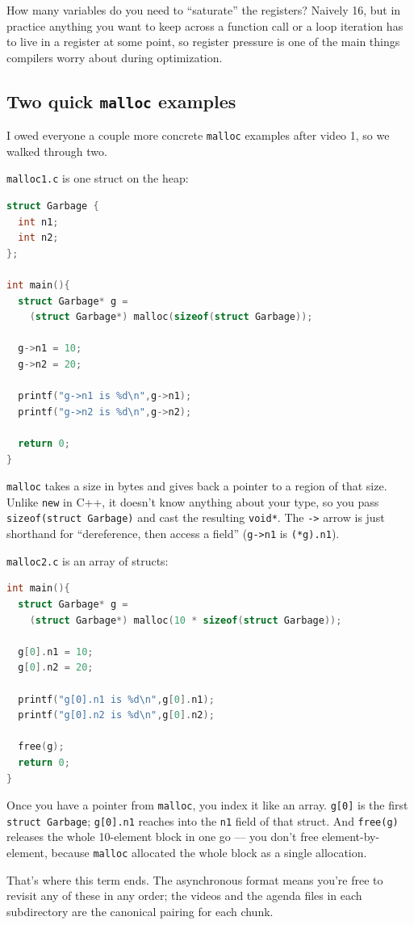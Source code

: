 \documentclass[11pt]{article}
\begin{document}
How many variables do you need to ``saturate'' the registers? Naively
16, but in practice anything you want to keep across a function call
or a loop iteration has to live in a register at some point, so
register pressure is one of the main things compilers worry about
during optimization.

\subsection*{Two quick \texttt{malloc} examples}

I owed everyone a couple more concrete \texttt{malloc} examples after
video 1, so we walked through two.

\texttt{malloc1.c} is one struct on the heap:

\begin{lstlisting}[language=C]
struct Garbage {
  int n1;
  int n2;
};

int main(){
  struct Garbage* g =
    (struct Garbage*) malloc(sizeof(struct Garbage));

  g->n1 = 10;
  g->n2 = 20;

  printf("g->n1 is %d\n",g->n1);
  printf("g->n2 is %d\n",g->n2);

  return 0;
}
\end{lstlisting}

\texttt{malloc} takes a size in bytes and gives back a pointer to a
region of that size. Unlike \texttt{new} in C++, it doesn't know
anything about your type, so you pass \texttt{sizeof(struct
  Garbage)} and cast the resulting \texttt{void*}. The \texttt{->}
arrow is just shorthand for ``dereference, then access a field''
(\texttt{g->n1} is \texttt{(*g).n1}).

\texttt{malloc2.c} is an array of structs:

\begin{lstlisting}[language=C]
int main(){
  struct Garbage* g =
    (struct Garbage*) malloc(10 * sizeof(struct Garbage));

  g[0].n1 = 10;
  g[0].n2 = 20;

  printf("g[0].n1 is %d\n",g[0].n1);
  printf("g[0].n2 is %d\n",g[0].n2);

  free(g);
  return 0;
}
\end{lstlisting}

Once you have a pointer from \texttt{malloc}, you index it like an
array. \texttt{g[0]} is the first \texttt{struct Garbage};
\texttt{g[0].n1} reaches into the \texttt{n1} field of that struct.
And \texttt{free(g)} releases the whole 10-element block in one go
--- you don't free element-by-element, because \texttt{malloc}
allocated the whole block as a single allocation.

That's where this term ends. The asynchronous format means you're
free to revisit any of these in any order; the videos and the agenda
files in each subdirectory are the canonical pairing for each chunk.
\end{document}
